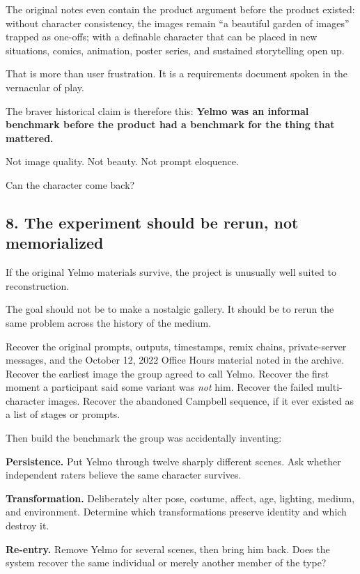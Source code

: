\documentclass[
]{article}
\begin{document}
The original notes even contain the product argument before the product
existed: without character consistency, the images remain ``a beautiful
garden of images'' trapped as one-offs; with a definable character that
can be placed in new situations, comics, animation, poster series, and
sustained storytelling open up.

That is more than user frustration. It is a requirements document spoken
in the vernacular of play.

The braver historical claim is therefore this: \textbf{Yelmo was an
informal benchmark before the product had a benchmark for the thing that
mattered.}

Not image quality. Not beauty. Not prompt eloquence.

Can the character come back?

\subsection{8. The experiment should be rerun, not
memorialized}\label{the-experiment-should-be-rerun-not-memorialized}

If the original Yelmo materials survive, the project is unusually well
suited to reconstruction.

The goal should not be to make a nostalgic gallery. It should be to
rerun the same problem across the history of the medium.

Recover the original prompts, outputs, timestamps, remix chains,
private-server messages, and the October 12, 2022 Office Hours material
noted in the archive. Recover the earliest image the group agreed to
call Yelmo. Recover the first moment a participant said some variant was
\emph{not} him. Recover the failed multi-character images. Recover the
abandoned Campbell sequence, if it ever existed as a list of stages or
prompts.

Then build the benchmark the group was accidentally inventing:

\textbf{Persistence.} Put Yelmo through twelve sharply different scenes.
Ask whether independent raters believe the same character survives.

\textbf{Transformation.} Deliberately alter pose, costume, affect, age,
lighting, medium, and environment. Determine which transformations
preserve identity and which destroy it.

\textbf{Re-entry.} Remove Yelmo for several scenes, then bring him back.
Does the system recover the same individual or merely another member of
the type?
\end{document}
